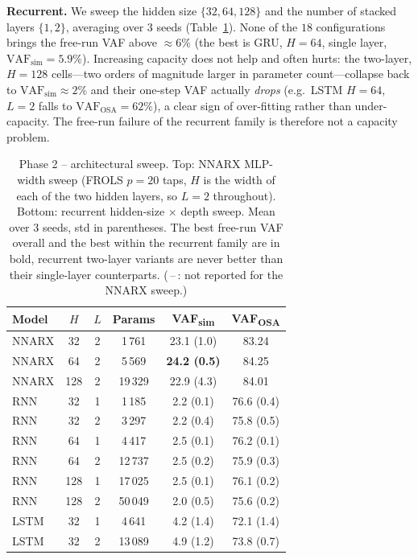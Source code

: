 \documentclass[10pt,twocolumn,letterpaper]{article}
\begin{document}
\noindent\textbf{Recurrent.} We sweep the hidden size $\{32,64,128\}$ and
the number of stacked layers $\{1,2\}$, averaging over $3$ seeds
(Table~\ref{tab:phase2}). None of the $18$ configurations brings the
free-run VAF above $\approx 6\%$ (the best is GRU, $H{=}64$, single layer,
$\mathrm{VAF_{sim}}=5.9\%$). Increasing capacity does not help and often
hurts: the two-layer, $H{=}128$ cells---two orders of magnitude larger in
parameter count---collapse back to $\mathrm{VAF_{sim}}\approx 2\%$ and
their one-step VAF actually \emph{drops} (e.g.\ LSTM $H{=}64$, $L{=}2$
falls to $\mathrm{VAF_{OSA}}=62\%$), a clear sign of over-fitting rather
than under-capacity. The free-run failure of the recurrent family is
therefore not a capacity problem.

\begin{table}[t]
\centering
\caption{Phase 2 -- architectural sweep. Top: NNARX MLP-width sweep
(FROLS $p{=}20$ taps, $H$ is the width of each of the two hidden layers,
so $L{=}2$ throughout). Bottom: recurrent hidden-size $\times$ depth
sweep. Mean over $3$ seeds, std in parentheses. The best free-run VAF
overall and the best within the recurrent family are in bold, recurrent
two-layer variants are never better than their single-layer counterparts.
($\,$--$\,$: not reported for the NNARX sweep.)}
\label{tab:phase2}
\footnotesize
\setlength{\tabcolsep}{4pt}
\begin{tabular}{lccccc}
\toprule
\textbf{Model} & \textbf{$H$} & \textbf{$L$} & \textbf{Params} &
\textbf{VAF\textsubscript{sim}} & \textbf{VAF\textsubscript{OSA}} \\
\midrule
NNARX &  32 & 2 &  1\,761 & 23.1 (1.0) & 83.24 \\
NNARX &  64 & 2 &  5\,569 & \textbf{24.2 (0.5)} & 84.25 \\
NNARX & 128 & 2 & 19\,329 & 22.9 (4.3) & 84.01 \\
\midrule
RNN  &  32 & 1 &  1\,185 & 2.2 (0.1) & 76.6 (0.4) \\
RNN  &  32 & 2 &  3\,297 & 2.2 (0.4) & 75.8 (0.5) \\
RNN  &  64 & 1 &  4\,417 & 2.5 (0.1) & 76.2 (0.1) \\
RNN  &  64 & 2 & 12\,737 & 2.5 (0.2) & 75.9 (0.3) \\
RNN  & 128 & 1 & 17\,025 & 2.5 (0.1) & 76.1 (0.2) \\
RNN  & 128 & 2 & 50\,049 & 2.0 (0.5) & 75.6 (0.2) \\
\midrule
LSTM &  32 & 1 &  4\,641 & 4.2 (1.4) & 72.1 (1.4) \\
LSTM &  32 & 2 & 13\,089 & 4.9 (1.2) & 73.8 (0.7) \\

\end{tabular}
\end{table}
\end{document}
